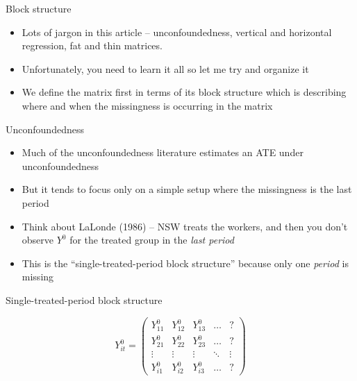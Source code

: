 \documentclass{beamer}
\begin{document}
\begin{frame}{Block structure}

\begin{itemize}
\item Lots of jargon in this article -- unconfoundedness, vertical and horizontal regression, fat and thin matrices.  
\item Unfortunately, you need to learn it all so let me try and organize it
\item We define the matrix first in terms of its block structure which is describing where and when the missingness is occurring in the matrix
\end{itemize}

\end{frame}

\begin{frame}{Unconfoundedness}

\begin{itemize}
\item Much of the unconfoundedness literature estimates an ATE under unconfoundedness 
\item But it tends to focus only on a simple setup where the missingness is the last period
\item Think about LaLonde (1986) -- NSW treats the workers, and then you don't observe $Y^0$ for the treated group in the \emph{last period}
\item This is the ``single-treated-period block structure'' because only one \emph{period} is missing
\end{itemize}

\end{frame}

\begin{frame}{Single-treated-period block structure}

\begin{center}
\[ Y^0_{it}  =\begin{pmatrix}
    Y^0_{11} & Y^0_{12} & Y^0_{13} & \dots  & ? \\
    Y^0_{21} & Y^0_{22} & Y^0_{23} & \dots  & ? \\
    \vdots & \vdots & \vdots & \ddots & \vdots \\
    Y^0_{i1} & Y^0_{i2} & Y^0_{i3} & \dots  & ?
\end{pmatrix}\]
\end{center}

\end{frame}
\end{document}
